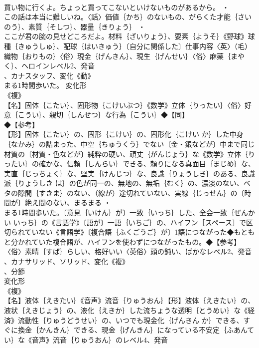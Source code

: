 \documentclass[8pt]{extreport}
\begin{document}
\begin{CJK}{UTF8}{min}
\\	買い物に行くよ。ちょっと買ってこないといけないものがあるから。 ・
\\	この話は本当に難しいね。〈話〉価値｛かち｝のないもの、がらくた才能｛さいのう｝、素質｛そしつ｝、器量｛きりょう｝ ・
\\	ここが君の腕の見せどころだよ。材料｛ざいりょう｝、要素｛ようそ｝《野球》球種｛きゅうしゅ｝、配球｛はいきゅう｝〔自分に関係した〕仕事内容〈英〉（毛）織物｛おりもの｝〈俗〉現金｛げんきん｝、現生｛げんせい｝〈俗〉麻薬｛まやく｝、ヘロインレベル2、発音
\\	、カナスタッフ、変化《動》
\\	まる1時間歩いた。	変化形 
\\	《複》
\\	【名】固体｛こたい｝、固形物｛こけいぶつ｝《数学》立体｛りったい｝〈俗〉好意｛こうい｝、親切｛しんせつ｝な行為｛こうい｝◆【同】
\\	◆【参考】
\\	【形】固体｛こたい｝の、固形｛こけい｝の、固形化｛こけい か｝した中身｛なかみ｝の詰まった、中空｛ちゅうくう｝でない〔金・銀などが〕中まで同じ材質の〔材質・色などが〕純粋の硬い、頑丈｛がんじょう｝な《数学》立体｛りったい｝の確かな、信頼｛しんらい｝できる、頼りになる真面目｛まじめ｝な、実直｛じっちょく｝な、堅実｛けんじつ｝な、良識｛りょうしき｝のある、良識派｛りょうしき は｝の色が同一の、無地の、無垢｛むく｝の、濃淡のない、ベタの隙間｛すきま｝のない、（線が）途切れていない、実線｛じっせん｝の〔時間が〕絶え間のない、まるまる ・
\\	まる1時間歩いた。〔意見｛いけん｝が〕一致｛いっち｝した、全会一致｛ぜんかい いっち｝の《言語学》〔語が〕一語｛いちご｝の、ハイフン［スペース］で区切られていない《言語学》〔複合語｛ふくごうご｝が〕1語につながった◆もともと分かれていた複合語が、ハイフンを使わずにつながったもの。◆【参考】
\\	〈俗〉素晴｛すば｝らしい、格好いい〈英俗〉頭の鈍い、ばかなレベル2、発音
\\	、カナサリッド、ソリッド、変化《複》
\\	、分節
\\	変化形 
\\	《複》
\\	【名】液体｛えきたい｝《音声》流音｛りゅうおん｝【形】液体｛えきたい｝の、液状｛えきじょう｝の、液化｛えきか｝した流ちょうな透明｛とうめい｝な《経済》流動性｛りゅうどうせい｝の、いつでも現金化｛げんきん か｝できる、すぐに換金｛かんきん｝できる、現金｛げんきん｝になっている不安定｛ふあんてい｝な《音声》流音｛りゅうおん｝のレベル4、発音

\end{CJK}
\end{document}
